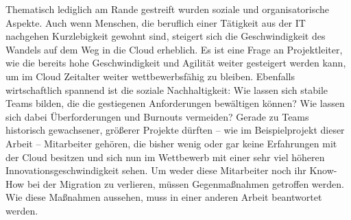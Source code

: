 Thematisch lediglich am Rande gestreift wurden soziale und organisatorische 
Aspekte. Auch wenn Menschen, die beruflich einer Tätigkeit aus der IT nachgehen 
Kurzlebigkeit gewohnt sind, steigert sich die Geschwindigkeit des Wandels auf 
dem Weg in die Cloud erheblich. Es ist eine Frage an Projektleiter, wie die 
bereits hohe Geschwindigkeit und Agilität weiter gesteigert werden kann, um im 
Cloud Zeitalter weiter wettbewerbsfähig zu bleiben. Ebenfalls wirtschaftlich 
spannend ist die soziale Nachhaltigkeit: Wie lassen sich stabile Teams bilden, 
die die gestiegenen Anforderungen bewältigen können? Wie lassen sich dabei 
Überforderungen und Burnouts vermeiden? Gerade zu Teams historisch gewachsener, 
größerer Projekte dürften -- wie im Beispielprojekt dieser Arbeit -- 
Mitarbeiter gehören, die bisher wenig oder gar keine Erfahrungen mit der 
Cloud besitzen und sich nun im Wettbewerb mit einer sehr viel höheren 
Innovationsgeschwindigkeit sehen. Um weder diese Mitarbeiter noch ihr Know-How 
bei der Migration zu verlieren, müssen Gegenmaßnahmen getroffen 
werden. Wie diese Maßnahmen aussehen, muss in einer anderen Arbeit beantwortet 
werden.


